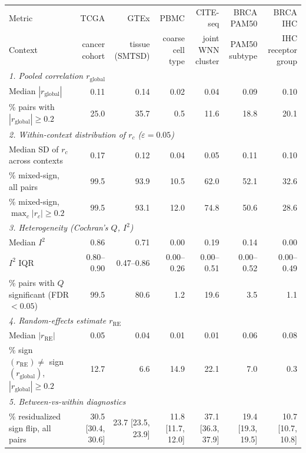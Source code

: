 \begin{tabular}{l*{6}{r}}
\toprule
Metric & TCGA & GTEx & PBMC & CITE-seq & BRCA PAM50 & BRCA IHC \\
Context & cancer cohort & tissue (SMTSD) & coarse cell type & joint WNN cluster & PAM50 subtype & IHC receptor group \\
\midrule
\multicolumn{7}{l}{\textit{1. Pooled correlation $r_{\mathrm{global}}$}} \\
Median $|r_{\mathrm{global}}|$ & 0.11 & 0.14 & 0.02 & 0.04 & 0.09 & 0.10 \\
\% pairs with $|r_{\mathrm{global}}| \geq 0.2$ & 25.0 & 35.7 & 0.5 & 11.6 & 18.8 & 20.1 \\
\midrule
\multicolumn{7}{l}{\textit{2. Within-context distribution of $r_c$ ($\varepsilon = 0.05$)}} \\
Median SD of $r_c$ across contexts & 0.17 & 0.12 & 0.04 & 0.05 & 0.11 & 0.10 \\
\% mixed-sign, all pairs & 99.5 & 93.9 & 10.5 & 62.0 & 52.1 & 32.6 \\
\% mixed-sign, $\max_c |r_c| \geq 0.2$ & 99.5 & 93.1 & 12.0 & 74.8 & 50.6 & 28.6 \\
\midrule
\multicolumn{7}{l}{\textit{3. Heterogeneity (Cochran's $Q$, $I^2$)}} \\
Median $I^2$ & 0.86 & 0.71 & 0.00 & 0.19 & 0.14 & 0.00 \\
$I^2$ IQR & 0.80--0.90 & 0.47--0.86 & 0.00--0.26 & 0.00--0.51 & 0.00--0.52 & 0.00--0.49 \\
\% pairs with $Q$ significant (FDR $< 0.05$) & 99.5 & 80.6 & 1.2 & 19.6 & 3.5 & 1.1 \\
\midrule
\multicolumn{7}{l}{\textit{4. Random-effects estimate $r_{\mathrm{RE}}$}} \\
Median $|r_{\mathrm{RE}}|$ & 0.05 & 0.04 & 0.01 & 0.01 & 0.06 & 0.08 \\
\% sign$(r_{\mathrm{RE}}) \neq$ sign$(r_{\mathrm{global}})$, $|r_{\mathrm{global}}| \geq 0.2$ & 12.7 & 6.6 & 14.9 & 22.1 & 7.0 & 0.3 \\
\midrule
\multicolumn{7}{l}{\textit{5. Between-vs-within diagnostics}} \\
\% residualized sign flip, all pairs & 30.5 [30.4, 30.6] & 23.7 [23.5, 23.9] & 11.8 [11.7, 12.0] & 37.1 [36.3, 37.9] & 19.4 [19.3, 19.5] & 10.7 [10.7, 10.8] \\

\end{tabular}

